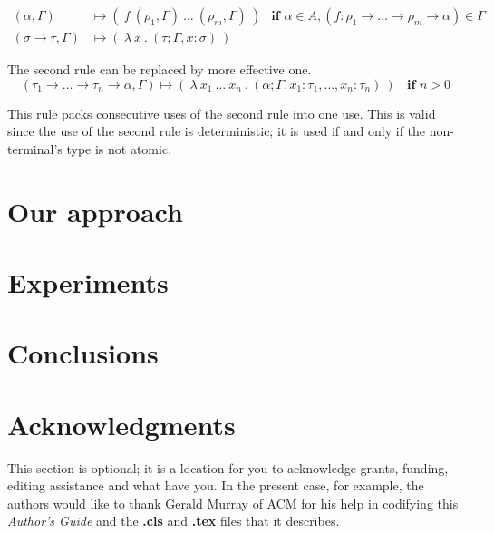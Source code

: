 \documentclass{sig-alternate}
\newcommand{\ar}{\rightarrow\xspace}
\newcommand{\gar}{\longmapsto}
\begin{document}
\begin{align*}
( \alpha , \Gamma )  
&\gar
(~f~( \rho_1 , \Gamma )~\dots~( \rho_m , \Gamma )~)
& \textbf{if } \alpha \in A,
(f : \rho_1 \ar \dots \ar \rho_m \ar \alpha) \in \Gamma
\\ 
( \sigma \rightarrow \tau , \Gamma )  
&\gar
(~\lambda~x~.~( \tau ; \Gamma,x:\sigma )~)
&   
\end{align*}

The second rule can be replaced by more effective one.
\[ 
( \tau_1 \ar \dots \ar \tau_n \ar \alpha , \Gamma )  
\gar
(~\lambda~x_1~\dots~x_n~.~
( \alpha ; \Gamma , x_1:\tau_1 , \dots , x_n:\tau_n  )~)
~~~~ \textbf{if } n > 0
\] 

This rule packs consecutive uses of the second rule into one use.
This is valid since the use of the second rule is deterministic;
it is used if and only if the non-terminal's type is not atomic.

\section{Our approach}
\label{approach}

\section{Experiments}
\label{experiments}

\section{Conclusions}
\label{conclusions}


\section{Acknowledgments}
This section is optional; it is a location for you
to acknowledge grants, funding, editing assistance and
what have you.  In the present case, for example, the
authors would like to thank Gerald Murray of ACM for
his help in codifying this \textit{Author's Guide}
and the \textbf{.cls} and \textbf{.tex} files that it describes.

%

%
%


\end{document}
